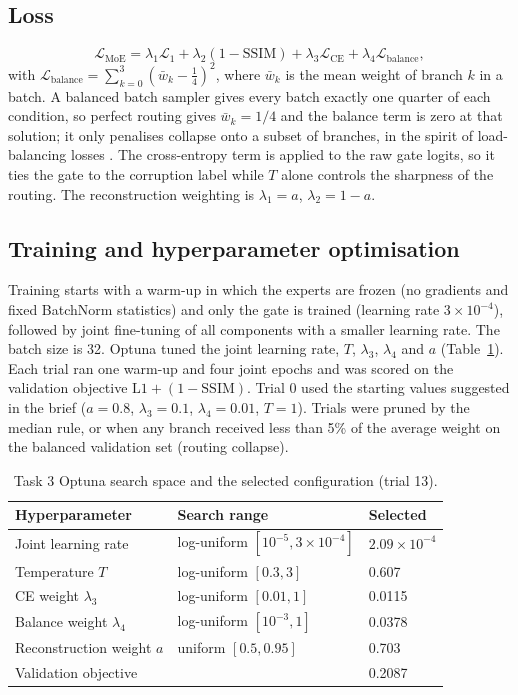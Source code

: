 \documentclass[conference]{IEEEtran}
\begin{document}
\subsection{Loss}
\begin{equation}
\mathcal{L}_{\text{MoE}} = \lambda_1 \mathcal{L}_1 + \lambda_2 (1 - \text{SSIM}) + \lambda_3 \mathcal{L}_{\text{CE}} + \lambda_4 \mathcal{L}_{\text{balance}},
\end{equation}
with $\mathcal{L}_{\text{balance}} = \sum_{k=0}^{3} (\bar{w}_k - \tfrac{1}{4})^2$, where $\bar{w}_k$ is the mean weight of branch $k$ in a batch. A balanced batch sampler gives every batch exactly one quarter of each condition, so perfect routing gives $\bar{w}_k = 1/4$ and the balance term is zero at that solution; it only penalises collapse onto a subset of branches, in the spirit of load-balancing losses \cite{shazeer2017,fedus2022}. The cross-entropy term is applied to the raw gate logits, so it ties the gate to the corruption label while $T$ alone controls the sharpness of the routing. The reconstruction weighting is $\lambda_1 = a$, $\lambda_2 = 1 - a$.

\subsection{Training and hyperparameter optimisation}
Training starts with a warm-up in which the experts are frozen (no gradients and fixed BatchNorm statistics) and only the gate is trained (learning rate $3\times10^{-4}$), followed by joint fine-tuning of all components with a smaller learning rate. The batch size is 32. Optuna tuned the joint learning rate, $T$, $\lambda_3$, $\lambda_4$ and $a$ (Table~\ref{tab:t3_optuna}). Each trial ran one warm-up and four joint epochs and was scored on the validation objective $\text{L1} + (1-\text{SSIM})$. Trial 0 used the starting values suggested in the brief ($a = 0.8$, $\lambda_3 = 0.1$, $\lambda_4 = 0.01$, $T = 1$). Trials were pruned by the median rule, or when any branch received less than 5\% of the average weight on the balanced validation set (routing collapse).

\begin{table}[t]
\centering
\caption{Task 3 Optuna search space and the selected configuration (trial 13).}
\label{tab:t3_optuna}
\footnotesize
\begin{tabular}{@{}lll@{}}
\toprule
Hyperparameter & Search range & Selected \\
\midrule
Joint learning rate & log-uniform $[10^{-5}, 3\times10^{-4}]$ & $2.09\times10^{-4}$ \\
Temperature $T$ & log-uniform $[0.3, 3]$ & 0.607 \\
CE weight $\lambda_3$ & log-uniform $[0.01, 1]$ & 0.0115 \\
Balance weight $\lambda_4$ & log-uniform $[10^{-3}, 1]$ & 0.0378 \\
Reconstruction weight $a$ & uniform $[0.5, 0.95]$ & 0.703 \\
\midrule
Validation objective & & 0.2087 \\
\bottomrule
\end{tabular}
\end{table}
\end{document}
